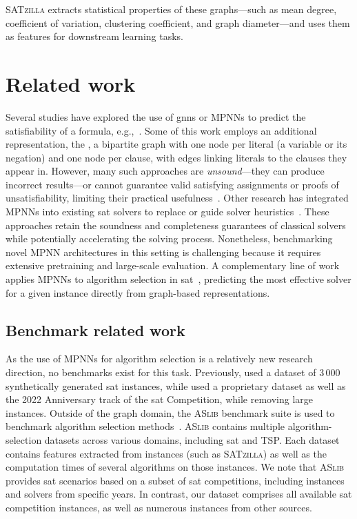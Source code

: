\textsc{SATzilla} extracts statistical properties of these graphs---such as mean degree, coefficient of variation, clustering coefficient, and graph diameter---and uses them as features for downstream learning tasks.

\section{Related work}

Several studies have explored the use of \glspl{gnn} or MPNNs to predict the satisfiability of a formula, e.g.,~\citet{SelEtAl19}. Some of this work employs an additional representation, the , a bipartite graph with one node per literal (a variable or its negation) and one node per clause, with edges linking literals to the clauses they appear in. However, many such approaches are \emph{unsound}---they can produce incorrect results---or cannot guarantee valid satisfying assignments or proofs of unsatisfiability, limiting their practical usefulness~\citep{SelEtAl19,LiEtAl24c}.  Other research has integrated MPNNs into existing \gls{sat} solvers to replace or guide solver heuristics~\citep{WanEtAl24,TonGro25}. These approaches retain the soundness and completeness guarantees of classical solvers while potentially accelerating the solving process. Nonetheless, benchmarking novel MPNN architectures in this setting is challenging because it requires extensive pretraining and large-scale evaluation.  A complementary line of work applies MPNNs to algorithm selection in \gls{sat}~\citep{ZhaEtAl24b,Shavit23}, predicting the most effective solver for a given instance directly from graph-based representations.

\subsection{Benchmark related work}
As the use of MPNNs for algorithm selection is a relatively new research direction, no benchmarks exist for this task. Previously, \citet{Shavit23} used a dataset of 3\,000 synthetically generated \gls{sat} instances, while \citet{ZhaEtAl24b} used a proprietary dataset as well as the 2022 Anniversary track of the \gls{sat} Competition, while removing large instances. Outside of the graph domain, the \textsc{ASlib} benchmark suite is used to benchmark algorithm selection methods~\citep{BisEtAl16b}. \textsc{ASlib} contains multiple algorithm-selection datasets across various domains, including \gls{sat} and TSP. Each dataset contains features extracted from instances (such as \textsc{SATzilla}) as well as the computation times of several algorithms on those instances. We note that \textsc{ASlib} provides \gls{sat} scenarios based on a subset of \gls{sat} competitions, including instances and solvers from specific years. In contrast, our dataset comprises all available \gls{sat} competition instances, as well as numerous instances from other sources.


